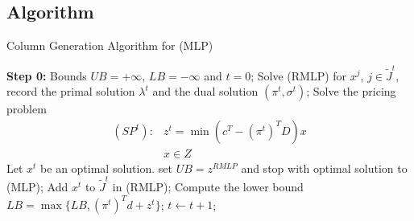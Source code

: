 \documentclass[12pt, openany]{report}
\theoremstyle{definition}
\begin{document}
\subsection{Algorithm}
\begin{algorithm}[H]
	\caption{Column Generation Algorithm for (MLP)}
	\label{algo:col}
	\begin{algorithmic}[1]
		\State \textbf{Step 0:} Bounds $UB = +\infty$, $LB= -\infty$ and $t=0$;
		\State Solve (RMLP) for $x^j$, $j\in \tilde J^t$, record the primal solution $\lambda^t$ and the dual solution $(\pi^t, \sigma^t)$;
		\State Solve the pricing problem 
		\begin{equation}
			\begin{aligned}
				(SP^t): & z^t = \min (c^T - (\pi^t)^T D)x\\
				& x\in Z
			\end{aligned}
		\end{equation}
		\State Let $x^t$ be an optimal solution.
		 set $UB=z^{RMLP}$ and stop with optimal solution to (MLP);
		\Else \State Add $x^t$ to $\tilde J^t$ in (RMLP);
		\EndIf
		\State Compute the lower bound $LB=\max\{LB,(\pi^t)^T d+z^t\}$;
		\State $t\gets t+1$;
		\EndWhile 
	\end{algorithmic}
\end{algorithm}
\end{document}

